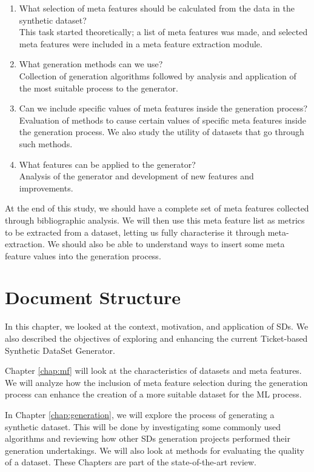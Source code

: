 \begin{enumerate}
  \item What selection of meta features should be calculated from the data in the synthetic dataset?\\
  This task started theoretically; a list of meta features was made, and selected meta features were included in a meta feature extraction module.
  \item What generation methods can we use?\\
  Collection of generation algorithms followed by analysis and application of the most suitable process to the generator.
  \item Can we include specific values of meta features inside the generation process?\\
  Evaluation of methods to cause certain values of specific meta features inside the generation process. We also study the utility of datasets that go through such methods.
  \item What features can be applied to the generator?\\
  Analysis of the generator and development of new features and improvements.
\end{enumerate}

At the end of this study, we should have a complete set of meta features collected through bibliographic analysis. We will then use this meta feature list as metrics to be extracted from a dataset, letting us fully characterise it through meta-extraction. We should also be able to understand ways to insert some meta feature values into the generation process.

\section{Document Structure}
In this chapter, we looked at the context, motivation, and application of SDs. We also described the objectives of exploring and enhancing the current Ticket-based Synthetic DataSet Generator.

Chapter \ref{chap:mf} will look at the characteristics of datasets and meta features. We will analyze how the inclusion of meta feature selection during the generation process can enhance the creation of a more suitable dataset for the ML process.

In Chapter \ref{chap:generation}, we will explore the process of generating a synthetic dataset. This will be done by investigating some commonly used algorithms and reviewing how other SDs generation projects performed their generation undertakings. We will also look at methods for evaluating the quality of a dataset. These Chapters are part of the state-of-the-art review. 


